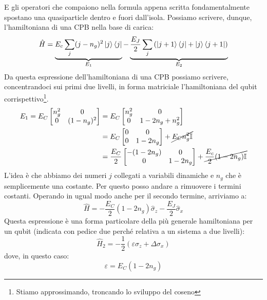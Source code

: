 E gli operatori che compaiono nella formula appena scritta fondamentalmente spostano una quasiparticle dentro e fuori dall'isola.
Possiamo scrivere, dunque, l'hamiltoniana di una CPB nella base di carica:
\begin{equation*}
    \hat H = \underbrace{E_c\sum_j (j - n_g)^2 \ket{j} \bra {j}}_{E_1} - \underbrace{\frac{E_J}{2}\sum_j \left( \ket{j+1} \bra{j} +\ket{j}\bra{j+1} \right)}_{E_2}
\end{equation*}
Da questa espressione dell'hamiltoniana di una CPB possiamo scrivere, concentrandoci sui primi due livelli, in forma matriciale l'hamiltoniana del qubit corrispettivo\footnote{Stiamo approssimando, troncando lo sviluppo del coseno}.
\begin{align*}
    E_1 = E_C \begin{bmatrix}
     n_g^2 & 0 \\
     0 & (1-n_g)^2
    \end{bmatrix}
    &= E_C \begin{bmatrix}
     n_g^2 & 0 \\
     0 & 1-2n_g + n_g^2
    \end{bmatrix}\\
    &= E_C \begin{bmatrix}
     0 & 0 \\
     0 & 1 - 2n_g
    \end{bmatrix} + \cancel{E_C n_g^2\mathbb{I}}\\
    &= \frac{E_C}{2} \begin{bmatrix}
     -(1-2n_g) & 0 \\
     0 & 1-2n_g
    \end{bmatrix} + \cancel{\frac{E_c}{2}(1-2n_g)\mathbb I}
\end{align*}
L'idea è che abbiamo dei numeri $j$ collegati a variabili dinamiche e $n_g$ che è semplicemente una costante. Per questo posso andare a rimuovere i termini costanti.
Operando in ugual modo anche per il secondo termine, arriviamo a:
\begin{equation*}
    \hat H =-\frac{E_C}{2}(1-2n_g)\hat \sigma_z - \frac{E_J}{2}\hat \sigma_x
\end{equation*}
Questa espressione è una forma particolare della più generale hamiltoniana per un qubit (indicata con pedice due perché relativa a un sistema a due livelli):
\begin{equation*}
    \hat H_2 = -\frac{1}{2}\left(\varepsilon \sigma_z + \Delta \sigma_x \right)
\end{equation*}
dove, in questo caso:
\begin{equation*}
    \varepsilon = E_C(1-2n_g)
\end{equation*}
